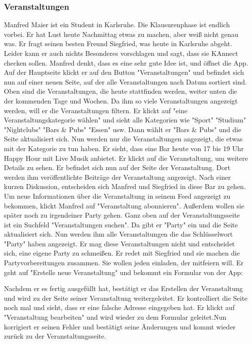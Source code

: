 \documentclass[parskip=full]{scrartcl}
\begin{document}
	\subsubsection{Veranstaltungen}
	Manfred Maier ist ein Student in Karlsruhe. Die Klausurenphase ist endlich vorbei. Er hat Lust heute Nachmittag etwas zu machen, aber weiß nicht genau was. Er fragt seinen besten Freund Siegfried, was heute in Karlsruhe abgeht. Leider kann er auch nichts Besonderes vorschlagen und sagt, dass sie KAnnect checken sollen. Manfred denkt, dass es eine sehr gute Idee ist, und öffnet die App.
	Auf der Hauptseite klickt er auf den Button "Veranstaltungen" und befindet sich nun auf einer neuen Seite, auf der alle Veranstaltungen nach Datum sortiert sind. Oben sind die Veranstaltungen, die heute stattfinden werden, weiter unten die der kommenden Tage und Wochen.
	Da ihm so viele Veranstaltungen angezeigt werden, will er die Veranstaltungen filtern. Er klickt auf "eine Veranstaltungskategorie wählen" und sieht alle Kategorien wie "Sport" "Studium" "Nightclubs" "Bars \& Pubs" "Essen" usw.
	Dann wählt er "Bars \& Pubs" und die Seite aktualisiert sich. Nun werden nur die Veranstaltungen angezeigt, die etwas mit der Kategorie zu tun haben.
	Er sieht, dass eine Bar heute von 17 bis 19 Uhr Happy Hour mit Live Musik anbietet. Er klickt auf die Veranstaltung, um weitere Details zu sehen. Er befindet sich nun auf der Seite der Veranstaltung. Dort werden ihm veröffentlichte Beiträge der Veranstaltung angezeigt. Nach einer kurzen Diskussion, entscheiden sich Manfred und Siegfried in diese Bar zu gehen. Um neue Informationen über die Veranstaltung in seinem Feed angezeigt zu bekommen, klickt Manfred auf "Veranstaltung abonnieren". Außerdem wollen sie später noch zu irgendeiner Party gehen. Ganz oben auf der Veranstaltungsseite ist ein Suchfeld "Veranstaltungen suchen". Da gibt er "Party" ein und die Seite aktualisiert sich. Nun werden ihm alle Veranstaltungen die das Schlüsselwort "Party" haben angezeigt. Er mag diese Veranstaltungen nicht und entscheidet sich, eine eigene Party zu schmeißen. Er redet mit Siegfried und sie machen die Partyvorbereitungen zusammen. Sie wollen jeden einladen, der mitfeiern will. Er geht auf "Erstelle neue Veranstaltung" und bekommt ein Formular von der App:


	Nachdem er es fertig ausgefüllt hat, bestätigt er das Erstellen der Veranstaltung und wird zu der Seite seiner Veranstaltung weitergeleitet. Er kontrolliert die Seite noch mal und sieht, dass er eine falsche Adresse eingegeben hat. Er klickt auf "Veranstaltung bearbeiten" und wird wieder zu dem Formular geleitet.Nun korrigiert er seinen Fehler und bestätigt seine Änderungen und kommt wieder zurück zu der Veranstaltungsseite.
\end{document}
